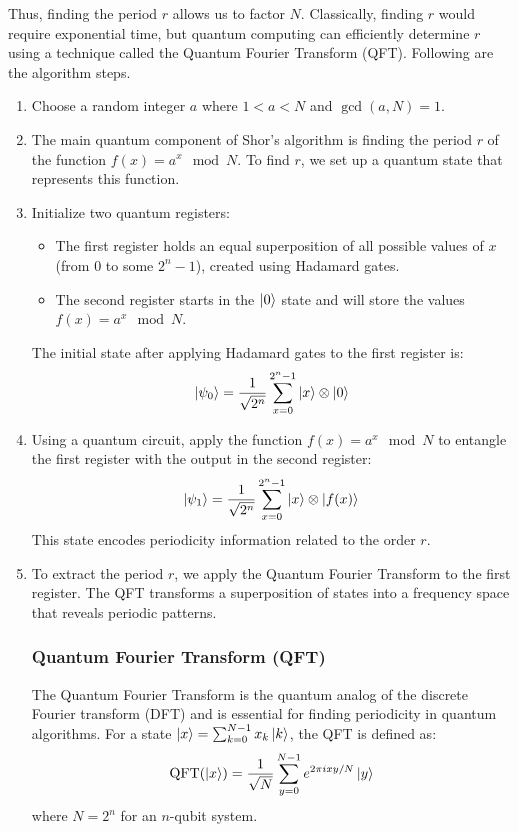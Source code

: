 \documentclass{article}
\begin{document}
		Thus, finding the period \( r \) allows us to factor \( N \). Classically, finding \( r \) would require exponential time, but quantum computing can efficiently determine \( r \) using a technique called the Quantum Fourier Transform (QFT). Following are the algorithm steps.

		\begin{enumerate}
			\item Choose a random integer \( a \) where \( 1 < a < N \) and \( \gcd(a, N) = 1 \).
			
			\item The main quantum component of Shor's algorithm is finding the period \( r \) of the function \( f(x) = a^x \mod N \). To find \( r \), we set up a quantum state that represents this function.

			\item Initialize two quantum registers:
				\begin{itemize}
					\item The first register holds an equal superposition of all possible values of \( x \) (from \( 0 \) to some \( 2^n - 1 \)), created using Hadamard gates.
					\item The second register starts in the \( \ket{0} \) state and will store the values \( f(x) = a^x \mod N \).
				\end{itemize}

				The initial state after applying Hadamard gates to the first register is:
				\[
				\ket{\psi_0} = \frac{1}{\sqrt{2^n}} \sum_{x=0}^{2^n - 1} \ket{x} \otimes \ket{0}
				\]

			\item Using a quantum circuit, apply the function \( f(x) = a^x \mod N \) to entangle the first register with the output in the second register:
				\[
				\ket{\psi_1} = \frac{1}{\sqrt{2^n}} \sum_{x=0}^{2^n - 1} \ket{x} \otimes \ket{f(x)}
				\]
				This state encodes periodicity information related to the order \( r \).

			\item To extract the period \( r \), we apply the Quantum Fourier Transform to the first register. The QFT transforms a superposition of states into a frequency space that reveals periodic patterns.

				\subsubsection*{Quantum Fourier Transform (QFT)}

				The Quantum Fourier Transform is the quantum analog of the discrete Fourier transform (DFT) and is essential for finding periodicity in quantum algorithms. For a state \( \ket{x} = \sum_{k=0}^{N-1} x_k \ket{k} \), the QFT is defined as:
				\[
				\text{QFT}(\ket{x}) = \frac{1}{\sqrt{N}} \sum_{y=0}^{N-1} e^{2\pi i x y / N} \ket{y}
				\]
				where \( N = 2^n \) for an \( n \)-qubit system.


\end{enumerate}
\end{document}
